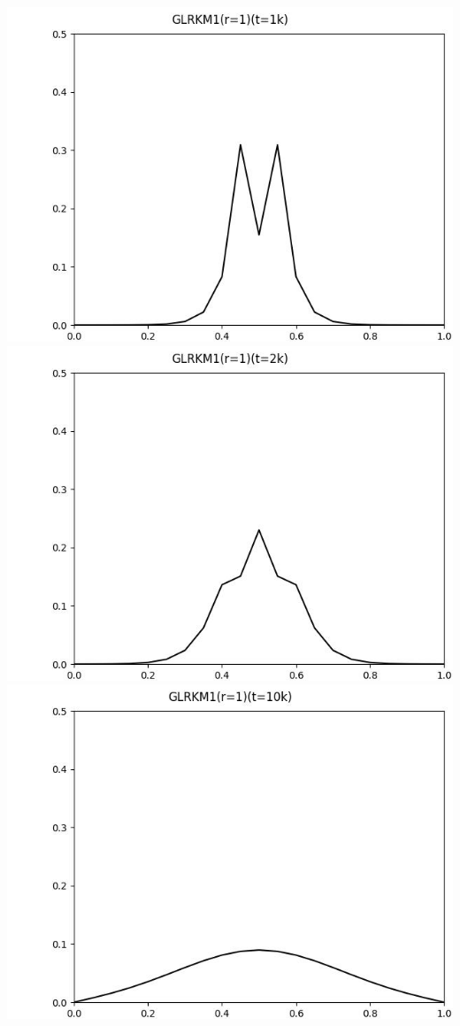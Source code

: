 \documentclass[12pt]{ctexart}
\begin{document}
\includegraphics[scale=0.35]{GLRKM1(r=1)(t=1k).jpg}
\includegraphics[scale=0.35]{GLRKM1(r=1)(t=2k).jpg}
\includegraphics[scale=0.35]{GLRKM1(r=1)(t=10k).jpg}
\end{document}

